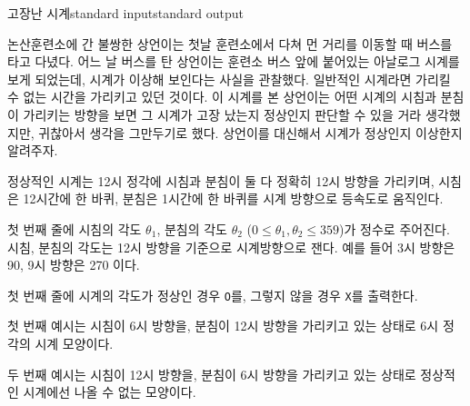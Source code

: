 \begin{problem}{고장난 시계}{standard input}{standard output}

논산훈련소에 간 불쌍한 상언이는 첫날 훈련소에서 다쳐 먼 거리를 이동할 때 버스를 타고 다녔다. 어느 날 버스를 탄 상언이는 훈련소 버스 앞에 붙어있는 아날로그 시계를 보게 되었는데, 시계가 이상해 보인다는 사실을 관찰했다. 일반적인 시계라면 가리킬 수 없는 시간을 가리키고 있던 것이다. 이 시계를 본 상언이는 어떤 시계의 시침과 분침이 가리키는 방향을 보면 그 시계가 고장 났는지 정상인지 판단할 수 있을 거라 생각했지만, 귀찮아서 생각을 그만두기로 했다. 상언이를 대신해서 시계가 정상인지 이상한지 알려주자.

정상적인 시계는 12시 정각에 시침과 분침이 둘 다 정확히 12시 방향을 가리키며, 시침은 12시간에 한 바퀴, 분침은 1시간에 한 바퀴를 시계 방향으로 등속도로 움직인다.

\InputFile
첫 번째 줄에 시침의 각도 $\theta_1$, 분침의 각도 $\theta_2$ ($0 \le \theta_1, \theta_2 \le 359$)가 정수로 주어진다.
시침, 분침의 각도는 12시 방향을 기준으로 시계방향으로 잰다. 예를 들어 3시 방향은 90, 9시 방향은 270 이다.

\OutputFile
첫 번째 줄에 시계의 각도가 정상인 경우 \texttt{O}를, 그렇지 않을 경우 \texttt{X}를 출력한다.

\Example

\begin{example}
%
%
\end{example}

\Notes
첫 번째 예시는 시침이 6시 방향을, 분침이 12시 방향을 가리키고 있는 상태로 6시 정각의 시계 모양이다.

두 번째 예시는 시침이 12시 방향을, 분침이 6시 방향을 가리키고 있는 상태로 정상적인 시계에선 나올 수 없는 모양이다.

\end{problem}
